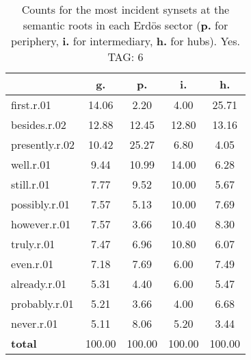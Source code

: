 \begin{table}[h!]
\begin{center}
\begin{tabular}{| l | c | c | c | c |}\hline
 & g. & p. & i. & h. \\\hline
first.r.01 & 14.06  & 2.20  & 4.00  & 25.71 \\\hline
besides.r.02 & 12.88  & 12.45  & 12.80  & 13.16 \\\hline
presently.r.02 & 10.42  & 25.27  & 6.80  & 4.05 \\\hline
well.r.01 & 9.44  & 10.99  & 14.00  & 6.28 \\\hline
still.r.01 & 7.77  & 9.52  & 10.00  & 5.67 \\\hline
possibly.r.01 & 7.57  & 5.13  & 10.00  & 7.69 \\\hline
however.r.01 & 7.57  & 3.66  & 10.40  & 8.30 \\\hline
truly.r.01 & 7.47  & 6.96  & 10.80  & 6.07 \\\hline
even.r.01 & 7.18  & 7.69  & 6.00  & 7.49 \\\hline
already.r.01 & 5.31  & 4.40  & 6.00  & 5.47 \\\hline
probably.r.01 & 5.21  & 3.66  & 4.00  & 6.68 \\\hline
never.r.01 & 5.11  & 8.06  & 5.20  & 3.44 \\\hline
{{\bf total}} & 100.00  & 100.00  & 100.00  & 100.00 \\\hline
\end{tabular}
\caption{Counts for the most incident synsets at the semantic roots in each Erd\"os sector ({\bf p.} for periphery, {\bf i.} for intermediary, {\bf h.} for hubs). Yes. TAG: 6}
\end{center}
\end{table}